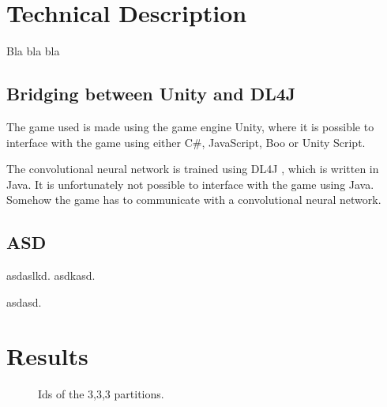 
\section{Technical Description}
Bla bla bla

\subsection{Bridging between Unity and DL4J}
The game used is made using the game engine Unity, where it is possible to interface with the game using either C\#, JavaScript, Boo or Unity Script.

The convolutional neural network is trained using DL4J , which is written in Java.
It is unfortunately not possible to interface with the game using Java. Somehow the game has to communicate with a convolutional neural network.

\subsection{ASD}
asdaslkd. asdkasd.

asdasd.

\section{Results}
\begin{figure}[H]
	\begin{scriptsize}
		\sffamily
		\def\svgwidth{\textwidth}
		
	\end{scriptsize}
	\caption{Ids of the 3,3,3 partitions.}
	\label{fig:ids}
\end{figure}